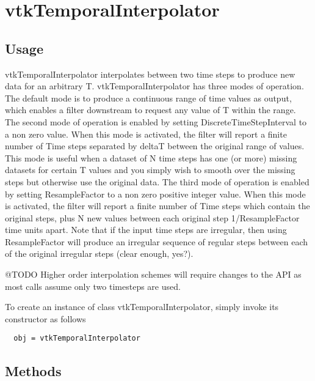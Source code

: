 \section{vtkTemporalInterpolator}

\subsection{Usage}

 vtkTemporalInterpolator interpolates between two time steps to
 produce new data for an arbitrary T.
 vtkTemporalInterpolator has three modes of operation. 
 The default mode is to produce a continuous range of time 
 values as output, which enables a filter downstream to request 
 any value of T within the range. 
 The second mode of operation is enabled by setting
 DiscreteTimeStepInterval to a non zero value. When this mode is
 activated, the filter will report a finite number of Time steps
 separated by deltaT between the original range of values.
 This mode is useful when a dataset of N time steps has one (or more)
 missing datasets for certain T values and you simply wish to smooth
 over the missing steps but otherwise use the original data.
 The third mode of operation is enabled by setting
 ResampleFactor to a non zero positive integer value. 
 When this mode is activated, the filter will report a finite number 
 of Time steps which contain the original steps, plus N new values between
 each original step 1/ResampleFactor time units apart.
 Note that if the input time steps are irregular, then using ResampleFactor
 will produce an irregular sequence of regular steps between 
 each of the original irregular steps (clear enough, yes?).

 @TODO
 Higher order interpolation schemes will require changes to the API
 as most calls assume only two timesteps are used.

To create an instance of class vtkTemporalInterpolator, simply
invoke its constructor as follows
\begin{verbatim}
  obj = vtkTemporalInterpolator
\end{verbatim}
\subsection{Methods}

